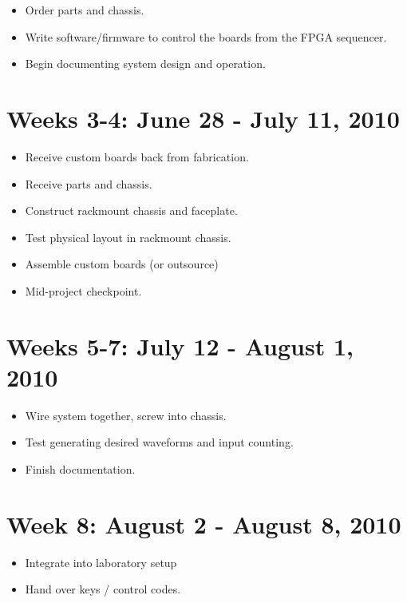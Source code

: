 \documentclass{article}
\begin{document}
\begin{itemize}
\item
Order parts and chassis.
\item
Write software/firmware to control the boards from the FPGA sequencer.
\item
Begin documenting system design and operation.
\end{itemize}

\section{Weeks 3-4: June 28 - July 11, 2010}

\begin{itemize}
\item
Receive custom boards back from fabrication.
\item
Receive parts and chassis.
\item
Construct rackmount chassis and faceplate.
\item
Test physical layout in rackmount chassis.
\item
Assemble custom boards (or outsource)
\item
Mid-project checkpoint.
\end{itemize}

\section{Weeks 5-7: July 12 - August 1, 2010}

\begin{itemize}
\item
Wire system together, screw into chassis.
\item
Test generating desired waveforms and input counting.
\item
Finish documentation.
\end{itemize}

\section{Week 8: August 2 - August 8, 2010}

\begin{itemize}
\item
Integrate into laboratory setup
\item
Hand over keys / control codes.
\end{itemize}
\end{document}
